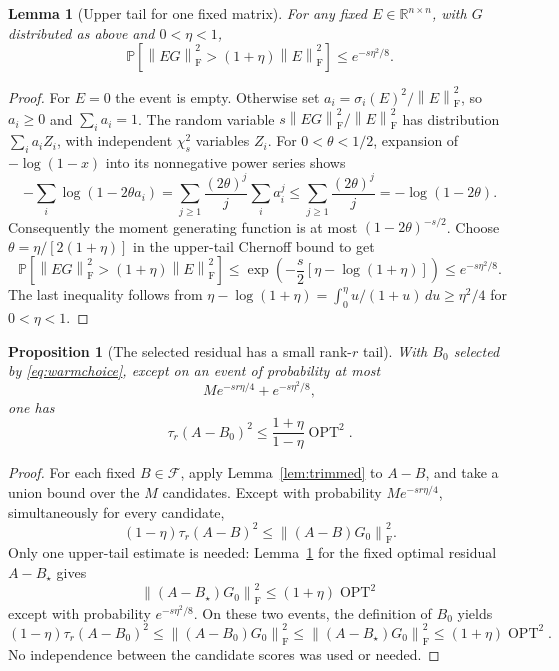 \documentclass[11pt]{article}
\numberwithin{equation}{section}
\newtheorem{lemma}[theorem]{Lemma}
\newtheorem{proposition}[theorem]{Proposition}
\theoremstyle{remark}
\newcommand{\R}{\mathbb R}
\newcommand{\Prob}{\mathbb P}
\newcommand{\F}{\mathcal F}
\newcommand{\OPT}{\operatorname{OPT}}
\newcommand{\norm}[1]{\left\lVert #1\right\rVert_{\mathrm F}}
\begin{document}
\begin{lemma}[Upper tail for one fixed matrix]\label{lem:upper}
For any fixed $E\in\R^{n\times n}$, with $G$ distributed as above and $0<\eta<1$,
\begin{equation}\label{eq:upper}
 \Prob\!\left[\norm{EG}^2>(1+\eta)\norm{E}^2\right]
 \le e^{-s\eta^2/8}.
\end{equation}
\end{lemma}
\begin{proof}
For $E=0$ the event is empty. Otherwise set
$a_i=\sigma_i(E)^2/\norm E^2$, so $a_i\ge0$ and $\sum_i a_i=1$.
The random variable $s\norm{EG}^2/\norm E^2$ has distribution $\sum_i a_iZ_i$, with independent $\chi_s^2$ variables $Z_i$.
For $0<\theta<1/2$, expansion of $-\log(1-x)$ into its nonnegative power series shows
\[
 -\sum_i\log(1-2\theta a_i)
 =\sum_{j\ge1}\frac{(2\theta)^j}{j}\sum_i a_i^j
 \le\sum_{j\ge1}\frac{(2\theta)^j}{j}
 =-\log(1-2\theta).
\]
Consequently the moment generating function is at most $(1-2\theta)^{-s/2}$.
Choose $\theta=\eta/[2(1+\eta)]$ in the upper-tail Chernoff bound to get
\[
 \Prob\!\left[\norm{EG}^2>(1+\eta)\norm E^2\right]
 \le \exp\!\left(-\frac{s}{2}[\eta-\log(1+\eta)]\right)
 \le e^{-s\eta^2/8}.
\]
The last inequality follows from
$\eta-\log(1+\eta)=\int_0^\eta u/(1+u)\,du\ge\eta^2/4$ for $0<\eta<1$.
\end{proof}

\begin{proposition}[The selected residual has a small rank-$r$ tail]\label{prop:warm}
With $B_0$ selected by \eqref{eq:warmchoice}, except on an event of probability at most
\begin{equation}\label{eq:warmfail}
 M e^{-sr\eta/4}+e^{-s\eta^2/8},
\end{equation}
one has
\begin{equation}\label{eq:warmtail}
 \tau_r(A-B_0)^2\le\frac{1+\eta}{1-\eta}\OPT^2.
\end{equation}
\end{proposition}
\begin{proof}
For each fixed $B\in\F$, apply Lemma~\ref{lem:trimmed} to $A-B$, and take a union bound over the $M$ candidates. Except with probability $M e^{-sr\eta/4}$, simultaneously for every candidate,
\[
 (1-\eta)\tau_r(A-B)^2\le\norm{(A-B)G_0}^2.
\]
Only one upper-tail estimate is needed: Lemma~\ref{lem:upper} for the fixed optimal residual $A-B_\star$ gives
\[
 \norm{(A-B_\star)G_0}^2\le(1+\eta)\OPT^2
\]
except with probability $e^{-s\eta^2/8}$. On these two events, the definition of $B_0$ yields
\[
 (1-\eta)\tau_r(A-B_0)^2
 \le\norm{(A-B_0)G_0}^2
 \le\norm{(A-B_\star)G_0}^2
 \le(1+\eta)\OPT^2.
\]
No independence between the candidate scores was used or needed.
\end{proof}
\end{document}
